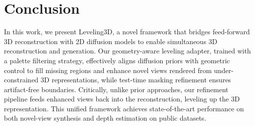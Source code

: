 \section{Conclusion}
In this work, we present Leveling3D, a novel framework that bridges feed-forward 3D reconstruction with 2D diffusion models to enable simultaneous 3D reconstruction and generation. Our geometry-aware leveling adapter, trained with a palette filtering strategy, effectively aligns diffusion priors with geometric control to fill missing regions and enhance novel views rendered from under-constrained 3D representations, while test-time masking refinement ensures artifact-free boundaries. Critically, unlike prior approaches, our refinement pipeline feeds enhanced views back into the reconstruction, leveling up the 3D representation. This unified framework achieves state-of-the-art performance on both novel-view synthesis and depth estimation on public datasets. 
